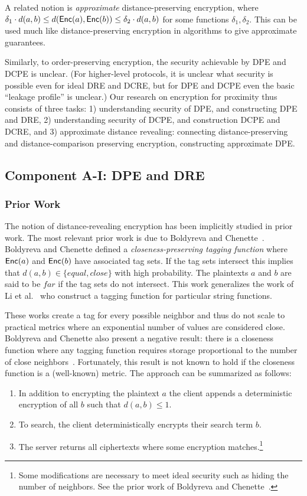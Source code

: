  A related notion is \emph{approximate} distance-preserving encryption, where  $\delta_1 \cdot d(a,b) \leq d(\mathsf{Enc}(a), \mathsf{Enc}(b)) \leq \delta_2  \cdot d(a,b)$ for some functions $\delta_1, \delta_2$.  This can be used much like distance-preserving encryption in algorithms to give approximate guarantees.

Similarly, to order-preserving encryption, the security achievable by DPE and DCPE is unclear.  (For higher-level protocols, it is unclear what security is possible even for ideal DRE and DCRE, but for DPE and DCPE even the basic ``leakage profile'' is unclear.)
Our research on encryption for proximity thus consists of three tasks: 1) understanding security of DPE, and constructing DPE and DRE, 2) understanding security of DCPE, and construction DCPE and DCRE,  and 3) approximate distance revealing: connecting   distance-preserving and distance-comparison preserving encryption, constructing approximate DPE.

\subsection{Component A-I: DPE and DRE}

\subsubsection{Prior Work}
The notion of distance-revealing encryption has been implicitly studied in prior work.  The most relevant prior work is due to Boldyreva and Chenette~\cite{boldyreva2014efficient}.  Boldyreva and Chenette defined a \emph{closeness-preserving tagging function} where $\mathsf{Enc}(a)$ and $\mathsf{Enc}(b)$ have associated tag sets.  If the tag sets intersect this implies that $d(a,b) \in\{equal, close\}$ with high probability.  The plaintexts $a$ and $b$ are said to be $far$ if the tag sets do not intersect.  This work generalizes the work of Li et al.~\cite{li2010fuzzy,wang2013efficient} who construct a tagging function for particular string functions.  

These works create a tag for every possible neighbor and thus do not scale to practical metrics where an exponential number of values are considered close. Boldyreva and Chenette also present a negative result: there is a closeness function where any tagging function requires storage proportional to the number of close neighbors~\cite[Theorem 5.2]{boldyreva2014efficient}.  Fortunately, this result is not known to hold if the closeness function is a (well-known) metric.  
The approach can be summarized as follows:
\begin{enumerate}
\item In addition to encrypting the plaintext $a$ the client appends a deterministic encryption of all $b$ such that $d(a,b) \le 1$.
\item To search, the client deterministically encrypts their search term $b$.
\item The server returns all ciphertexts where some encryption matches.\footnote{Some  modifications are necessary to meet ideal security such as hiding the number of neighbors.  See the prior work of Boldyreva and Chenette~\cite{boldyreva2014efficient}.}  
\end{enumerate}

